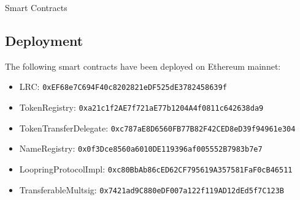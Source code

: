 \documentclass[UTF8,nofonts]{ctexart}
\makeatletter
\newenvironment{figurehere}
 {\def\@captype{figure}}
 {}
\makeatother
\begin{document}
\begin{appendices}
\begin{center}
\begin{figurehere}
\caption{Smart Contracts}
\label{fig:smartcontracts}
\end{figurehere}
\end{center}

\subsection{Deployment}

The following smart contracts have been deployed on Ethereum mainnet:
\begin{itemize}
\item LRC: \verb|0xEF68e7C694F40c8202821eDF525dE3782458639f|
\item TokenRegistry: \verb|0xa21c1f2AE7f721aE77b1204A4f0811c642638da9|
\item TokenTransferDelegate: \verb|0xc787aE8D6560FB77B82F42CED8eD39f94961e304|
\item NameRegistry: \verb|0x0f3Dce8560a6010DE119396af005552B7983b7e7|
\item LoopringProtocolImpl: \verb|0xc80BbAb86cED62CF795619A357581FaF0cB46511|
\item TransferableMultsig: \verb|0x7421ad9C880eDF007a122f119AD12dEd5f7C123B|
\end{itemize}

\end{appendices}
\end{document}
